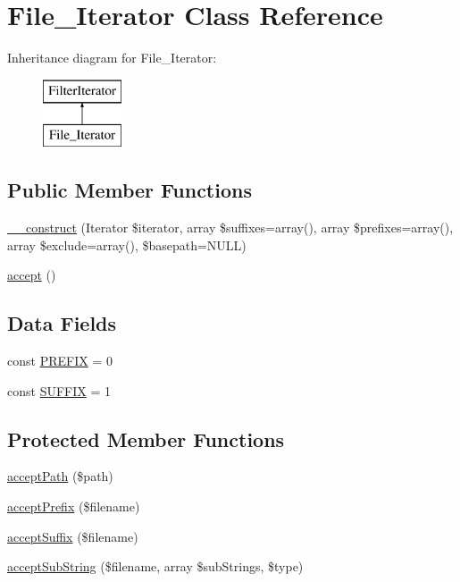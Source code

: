 \hypertarget{class_file___iterator}{}\section{File\+\_\+\+Iterator Class Reference}
\label{class_file___iterator}
Inheritance diagram for File\+\_\+\+Iterator\+:\begin{figure}[H]
\begin{center}
\leavevmode
\includegraphics[height=2.000000cm]{class_file___iterator}
\end{center}
\end{figure}
\subsection*{Public Member Functions}
\begin{DoxyCompactItemize}
\item 
\mbox{\hyperlink{class_file___iterator_a2b2c79c136d4bf89ff9386ea9c00bb79}{\+\_\+\+\_\+construct}} (Iterator \$iterator, array \$suffixes=array(), array \$prefixes=array(), array \$exclude=array(), \$basepath=N\+U\+LL)
\item 
\mbox{\hyperlink{class_file___iterator_acb64affba32059c09533892d9ded224a}{accept}} ()
\end{DoxyCompactItemize}
\subsection*{Data Fields}
\begin{DoxyCompactItemize}
\item 
const \mbox{\hyperlink{class_file___iterator_a2a00ef970c682ccf10b5376d22fa5c8a}{P\+R\+E\+F\+IX}} = 0
\item 
const \mbox{\hyperlink{class_file___iterator_a4c9304aab4e45943e021a2d495b546b4}{S\+U\+F\+F\+IX}} = 1
\end{DoxyCompactItemize}
\subsection*{Protected Member Functions}
\begin{DoxyCompactItemize}
\item 
\mbox{\hyperlink{class_file___iterator_af5fc60f73c711885bc29e74a37f7973c}{accept\+Path}} (\$path)
\item 
\mbox{\hyperlink{class_file___iterator_a3654bbc5c3c3b0500489a0b04b72ec5e}{accept\+Prefix}} (\$filename)
\item 
\mbox{\hyperlink{class_file___iterator_a0657a6bfd5359447b58a0c5f85eb8c27}{accept\+Suffix}} (\$filename)
\item 
\mbox{\hyperlink{class_file___iterator_ab44457337040c072c2992a5c71f3ca3f}{accept\+Sub\+String}} (\$filename, array \$sub\+Strings, \$type)
\end{DoxyCompactItemize}
